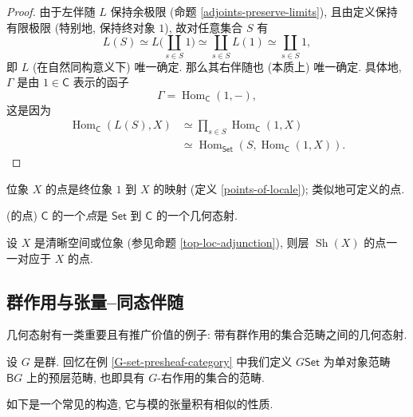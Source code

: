 \begin{proof}
    由于左伴随 $L$ 保持余极限 (命题 \ref{adjoints-preserve-limits}),
    且由定义保持有限极限 (特别地, 保持终对象 $1$), 故对任意集合 $S$ 有
    $$
        L(S) \simeq L \Big(\coprod_{s\in S} 1\Big)
        \simeq \coprod_{s\in S} L(1)
        \simeq \coprod_{s\in S} 1,
    $$
    即 $L$ (在自然同构意义下) 唯一确定. 那么其右伴随也 (本质上) 唯一确定. 具体地, $\Gamma$ 是由 $1\in\mathsf C$ 表示的函子
    $$\Gamma = \operatorname{Hom}_{\mathsf C}(1,-),$$
    这是因为
    \begin{align*}
    	\operatorname{Hom}_{\mathsf C}(L(S),X)&
    	\simeq
    	\prod_{s\in S}\operatorname{Hom}_{\mathsf C}(1,X)\\
    	&\simeq
    	\operatorname{Hom}_{\mathsf {Set}}(S,\operatorname{Hom}_{\mathsf C}(1,X)).
    \end{align*}
\end{proof}

位象 $X$ 的点是终位象 $1$ 到 $X$ 的映射 (定义 \ref{points-of-locale}); 类似地可定义\topos{}的点.

\begin{definition}
    {(\topos{}的点)}
    \topos{} $\mathsf C$ 的一个\emph{点}是
    $\mathsf {Set}$ 到 $\mathsf C$ 的一个几何态射.
\end{definition}

\begin{prop}
	{}
	设 $X$ 是清晰空间或位象 (参见命题 \ref{top-loc-adjunction}), 则层\topos{} $\operatorname{Sh}(X)$ 的点一一对应于 $X$ 的点.
\end{prop}

%
%	

\subsection{群作用与张量--同态伴随}

几何态射有一类重要且有推广价值的例子: 带有群作用的集合范畴之间的几何态射.

设 $G$ 是群. 回忆在例 \ref{G-set-presheaf-category} 中我们定义 $G\mathsf {Set}$ 为单对象范畴 $\mathsf BG$ 上的预层范畴, 也即具有 $G$-右作用的集合的范畴.

如下是一个常见的构造, 它与模的张量积有相似的性质.

